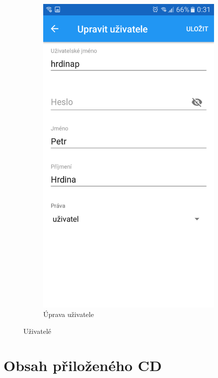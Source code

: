 \documentclass[czech,BP]{thesiskiv}
\begin{document}
\begin{figure}[H]
\begin{subfigure}[b]{0.3\textwidth}
	\includegraphics[width=\textwidth]{../images/client_android/Screenshot_20170612-003127.png}	
	\caption{Úprava uživatele}
	\label{fig:Screenshot_20170612-003127}
  \end{subfigure}
  \caption{Uživatelé}
\end{figure}



\chapter{Obsah přiloženého CD}
\end{document}
